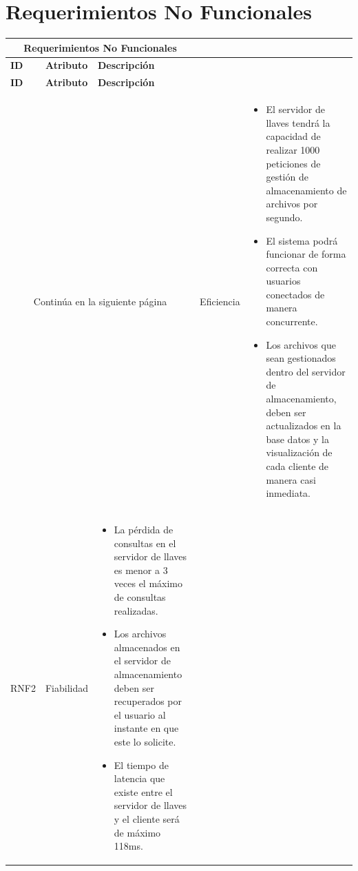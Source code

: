 \section{Requerimientos No Funcionales }
\begin{longtable}{| p{1.5cm} | p{3cm} | p{11cm} |}

\hline
\multicolumn{3}{|c|}{\textbf{Requerimientos No Funcionales}} \\ \hline
\textbf{ID} & \textbf{Atributo} & \textbf{Descripción}\\
\hline \hline
\endfirsthead

\hline
\textbf{ID} & \textbf{Atributo} & \textbf{Descripción}\\
\hline \hline
\endhead

\multicolumn{3}{|c|}{Continúa en la siguiente página}
\endfoot

\endlastfoot

RNF1 & Eficiencia & \begin{itemize} 
\item El servidor de llaves tendrá la capacidad de realizar 1000 peticiones de gestión de almacenamiento de archivos por segundo. 
\item El sistema podrá funcionar de forma correcta con usuarios conectados de manera concurrente. 
\item Los archivos que sean gestionados dentro del servidor de almacenamiento, deben ser actualizados en la base datos y la visualización de cada cliente de manera casi inmediata. 
\end{itemize}
\\ \hline

RNF2 & Fiabilidad & \begin{itemize} 
\item La pérdida de consultas en el servidor de llaves es menor a 3 veces el máximo de consultas realizadas. 
\item Los archivos almacenados en el servidor de almacenamiento deben ser recuperados por el usuario al instante en que este lo solicite. 
\item El tiempo de latencia que existe entre el servidor de llaves y el cliente será de máximo 118ms. 
\end{itemize}
\\ \hline


\end{longtable}
